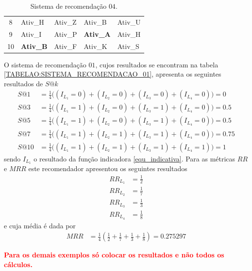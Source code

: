\begin{table}[!htbp]
\begin{subtable}{.5\linewidth}
\begin{tabular}{cllll}
         		8                & Ativ\_H   			& Ativ\_Z    			& Ativ\_B   		& Ativ\_U	                 \\
         		9                & Ativ\_I    			& Ativ\_P   			& \textbf{Ativ\_A}	& Ativ\_H	                 \\
         		10               & \textbf{Ativ\_B}  	& Ativ\_F    			& Ativ\_K    		& Ativ\_S		     \\ \hline
         		\end{tabular}
         	\caption{Sistema de recomendação \(04\).}
      		\label{TABELAO:SISTEMA_RECOMENDACAO_04}
         \end{subtable}
\label{TABELAO}
\end{table}
O sistema de recomendação \(01\), cujos resultados se encontram na tabela \ref{TABELAO:SISTEMA_RECOMENDACAO_01}, apresenta os seguintes resultados de \(S@k\)
\begin{align}
S@1 &= \frac{1}{4}  \Big( (I_{L_{1}} = 0) + (I_{L_{2}} = 0) + (I_{L_{3}} = 0) + (I_{L_{4}} = 0) \Big)	=	0		\\
S@3 &= \frac{1}{4}  \Big( (I_{L_{1}} = 1) + (I_{L_{2}} = 0) + (I_{L_{3}} = 1) + (I_{L_{4}} = 0) \Big)	=	0.5		\\
S@5 &= \frac{1}{4}  \Big( (I_{L_{1}} = 1) + (I_{L_{2}} = 0) + (I_{L_{3}} = 1) + (I_{L_{4}} = 0) \Big)	=	0.5		\\
S@7 &= \frac{1}{4}  \Big( (I_{L_{1}} = 1) + (I_{L_{2}} = 1) + (I_{L_{3}} = 1) + (I_{L_{4}} = 0) \Big)	=	0.75	\\
S@10 &= \frac{1}{4} \Big( (I_{L_{1}} = 1) + (I_{L_{2}} = 1) + (I_{L_{3}} = 1) + (I_{L_{4}} = 1) \Big) 	=	1		
\end{align}
sendo \(I_{L_{1}}\) o resultado da função indicadora \eqref{equ_indicativa}. Para as métricas \(RR\) e \(MRR\) este recomendador apresentou os seguintes resultados
\begin{align}
RR_{L_{1}} &= \frac{1}{2}		\\
RR_{L_{2}} &= \frac{1}{7}		\\
RR_{L_{3}} &= \frac{1}{3}		\\
RR_{L_{4}} &= \frac{1}{8}		
\end{align}
e cuja média é dada por 
\begin{align}
MRR &= \frac{1}{4} \left( \frac{1}{2} + \frac{1}{7} + \frac{1}{3} + \frac{1}{8} \right) = 0.275297
\end{align}


\textbf{\textcolor{red}{Para os demais exemplos só colocar os resultados e não todos os cálculos.}}

